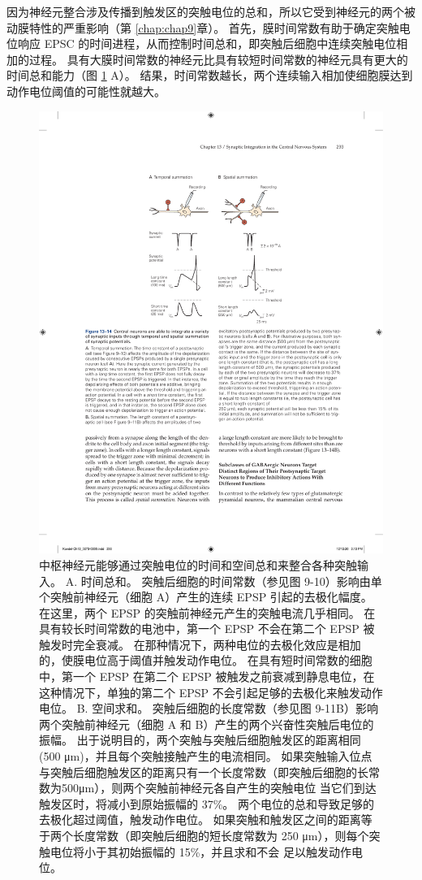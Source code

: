 因为神经元整合涉及传播到触发区的突触电位的总和，所以它受到神经元的两个被动膜特性的严重影响（第  \ref{chap:chap9}章）。 
首先，膜时间常数有助于确定突触电位响应 EPSC 的时间进程，从而控制时间总和，即突触后细胞中连续突触电位相加的过程。 
具有大膜时间常数的神经元比具有较短时间常数的神经元具有更大的时间总和能力（图 \ref{fig:13_14} A）。 
结果，时间常数越长，两个连续输入相加使细胞膜达到动作电位阈值的可能性就越大。

\begin{figure}[htbp]
	\centering
	\includegraphics[width=0.6\linewidth]{chap13/fig_13_14}
	\caption{中枢神经元能够通过突触电位的时间和空间总和来整合各种突触输入。 A. 时间总和。 突触后细胞的时间常数（参见图 9-10）影响由单个突触前神经元（细胞 A）产生的连续 EPSP 引起的去极化幅度。 在这里，两个 EPSP 的突触前神经元产生的突触电流几乎相同。 在具有较长时间常数的电池中，第一个 EPSP 不会在第二个 EPSP 被触发时完全衰减。 在那种情况下，两种电位的去极化效应是相加的，使膜电位高于阈值并触发动作电位。 在具有短时间常数的细胞中，第一个 EPSP 在第二个 EPSP 被触发之前衰减到静息电位，在这种情况下，单独的第二个 EPSP 不会引起足够的去极化来触发动作电位。 B. 空间求和。 突触后细胞的长度常数（参见图 9-11B）影响两个突触前神经元（细胞 A 和 B）产生的两个兴奋性突触后电位的振幅。 出于说明目的，两个突触与突触后细胞触发区的距离相同 (500 μm)，并且每个突触接触产生的电流相同。 如果突触输入位点与突触后细胞触发区的距离只有一个长度常数（即突触后细胞的长常数为500μm），则两个突触前神经元各自产生的突触电位 当它们到达触发区时，将减小到原始振幅的 37\%。 两个电位的总和导致足够的去极化超过阈值，触发动作电位。 如果突触和触发区之间的距离等于两个长度常数（即突触后细胞的短长度常数为 250 μm），则每个突触电位将小于其初始振幅的 15\%，并且求和不会 足以触发动作电位。}
	\label{fig:13_14}
\end{figure}


